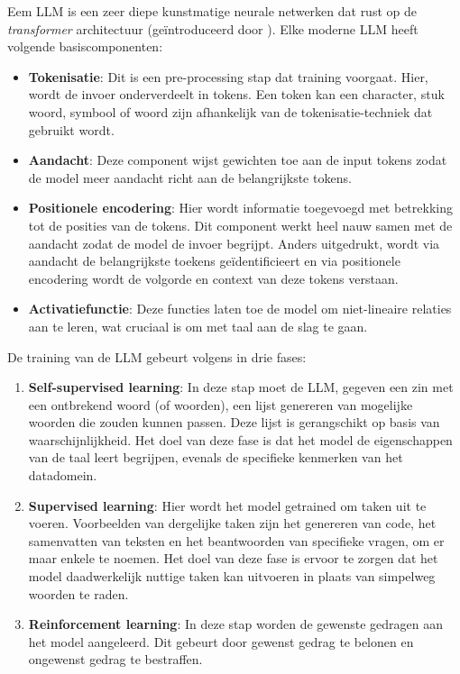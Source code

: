 Eem LLM is een zeer diepe kunstmatige neurale netwerken dat rust op de \emph{transformer} architectuur (geïntroduceerd door \textcite{Vaswani2017}). Elke moderne LLM heeft volgende basiscomponenten: 
\begin{itemize} 
    \item \textbf{Tokenisatie}: Dit is een pre-processing stap dat training voorgaat. Hier, wordt de invoer onderverdeelt in tokens. Een token kan een character, stuk woord, symbool of woord zijn afhankelijk van de tokenisatie-techniek dat gebruikt wordt.
    \item \textbf{Aandacht}: Deze component wijst gewichten toe aan de input tokens zodat de model meer aandacht richt aan de belangrijkste tokens.
    \item \textbf{Positionele encodering}: Hier wordt informatie toegevoegd met betrekking tot de posities van de tokens. Dit component werkt heel nauw samen met de aandacht zodat de model de invoer begrijpt. Anders uitgedrukt, wordt via aandacht de belangrijkste toekens geïdentificieert en via positionele encodering wordt de volgorde en context van deze tokens verstaan.
    \item \textbf{Activatiefunctie}: Deze functies laten toe de model om niet-lineaire relaties aan te leren, wat cruciaal is om met taal aan de slag te gaan.
\end{itemize}

De training van de LLM gebeurt volgens \textcite{Bach2024} in drie fases:
\begin{enumerate} 
    \item \textbf{Self-supervised learning}: In deze stap moet de LLM, gegeven een zin met een ontbrekend woord (of woorden), een lijst genereren van mogelijke woorden die zouden kunnen passen. Deze lijst is gerangschikt op basis van waarschijnlijkheid. Het doel van deze fase is dat het model de eigenschappen van de taal leert begrijpen, evenals de specifieke kenmerken van het datadomein.
    \item \textbf{Supervised learning}: Hier wordt het model getrained om taken uit te voeren. Voorbeelden van dergelijke taken zijn het genereren van code, het samenvatten van teksten en het beantwoorden van specifieke vragen, om er maar enkele te noemen. Het doel van deze fase is ervoor te zorgen dat het model daadwerkelijk nuttige taken kan uitvoeren in plaats van simpelweg woorden te raden.
    \item \textbf{Reinforcement learning}: In deze stap worden de gewenste gedragen aan het model aangeleerd. Dit gebeurt door gewenst gedrag te belonen en ongewenst gedrag te bestraffen.
\end{enumerate}

